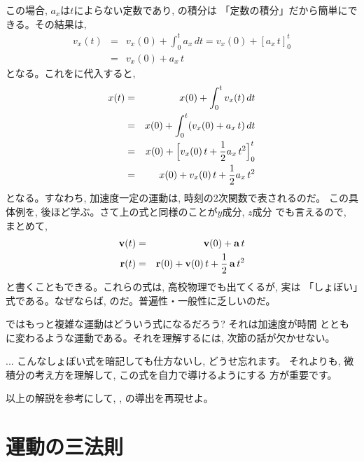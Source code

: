 この場合, $a_x$は$t$によらない定数であり, の積分は
「定数の積分」だから簡単にできる。その結果は, 
\begin{eqnarray}
v_x(t)&=&v_x(0)+\int_{0}^{t}a_x\, dt=v_x(0)+[a_x\,t]_{0}^{t}\nonumber\\
&=&v_x(0)+a_x\,t\label{eq:constacc_vx}
\end{eqnarray}
となる。これをに代入すると, 
\begin{eqnarray}
x(t)&=&x(0)+\int_{0}^{t}v_x(t)\, dt\nonumber\\
&=&x(0)+\int_{0}^{t}(v_x(0)+a_x\,t)\, dt\nonumber\\
&=&x(0)+\Bigl[v_x(0)\,t+\frac{1}{2}a_x\,t^2\Bigr]_0^t\nonumber\\
&=&x(0)+v_x(0)\,t+\frac{1}{2}a_x\,t^2\label{eq:constacc_x}
\end{eqnarray}
となる。すなわち, 加速度一定の運動は, 時刻の2次関数で表されるのだ。
この具体例を, 後ほど学ぶ。さて上の式と同様のことが$y$成分, $z$成分
でも言えるので, まとめて, 
\begin{eqnarray}
{\bf v}(t)&=&{\bf v}(0)+{\bf a}\,t\label{eq:constacc_v5}\\
{\bf r}(t)&=&{\bf r}(0)+{\bf v}(0)\,t+\frac{1}{2}\,{\bf a}\,t^2\label{eq:constacc_r5}
\end{eqnarray}
と書くこともできる。これらの式は, 高校物理でも出てくるが, 実は
「しょぼい」式である。なぜならば, のだ。普遍性・一般性に乏しいのだ。

ではもっと複雑な運動はどういう式になるだろう? それは加速度が時間
とともに変わるような運動である。それを理解するには, 次節の話が欠かせない。\mv

\begin{faq}{\small{} ... こんなしょぼい式を暗記しても仕方ないし, どうせ忘れます。
それよりも, 微積分の考え方を理解して, この式を自力で導けるようにする
方が重要です。}\end{faq}

\begin{q}\label{q:constaccel} 以上の解説を参考にして, 
, の導出を再現せよ。\end{q}
\mv


\section{運動の三法則}

